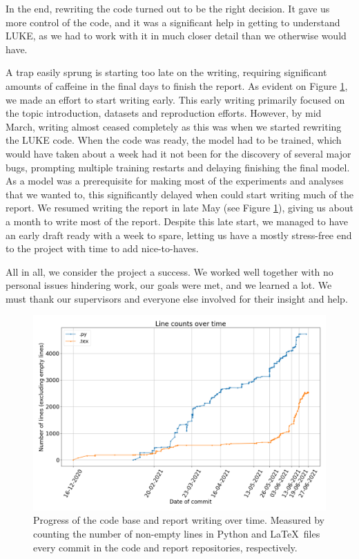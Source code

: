 \documentclass[12pt,fleqn]{article}
\begin{document}
In the end, rewriting the code turned out to be the right decision.
It gave us more control of the code, and it was a significant help in getting to understand LUKE, as we had to work with it in much closer detail than we otherwise would have.

A trap easily sprung is starting too late on the writing, requiring significant amounts of caffeine in the final days to finish the report.
As evident on Figure \ref{fig:linecounts}, we made an effort to start writing early.
This early writing primarily focused on the topic introduction, datasets and reproduction efforts.
However, by mid March, writing almost ceased completely as this was when we started rewriting the LUKE code.
When the code was ready, the model had to be trained, which would have taken about a week had it not been for the discovery of several major bugs, prompting multiple training restarts and delaying finishing the final model.
As a model was a prerequisite for making most of the experiments and analyses that we wanted to, this significantly delayed when could start writing much of the report.
We resumed writing the report in late May (see Figure \ref{fig:linecounts}), giving us about a month to write most of the report.
Despite this late start, we managed to have an early draft ready with a week to spare, letting us have a mostly stress-free end to the project with time to add nice-to-haves.

All in all, we consider the project a success.
We worked well together with no personal issues hindering work, our goals were met, and we learned a lot.
We must thank our supervisors and everyone else involved for their insight and help.
\begin{figure}[H]
    \centering
    \includegraphics[width=\textwidth]{Linecounts}
    \caption{
        Progress of the code base and report writing over time.
        Measured by counting the number of non-empty lines in Python and \LaTeX\ files every commit in the code and report repositories, respectively.
    }
    \label{fig:linecounts}
\end{figure}\noindent
\end{document}
